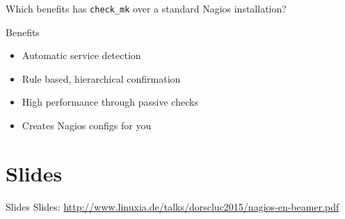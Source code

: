 Which benefits has \verb|check_mk| over a standard Nagios installation?

\begin{frame}[fragile]{Benefits}
\begin{itemize}
\item Automatic service detection
\item Rule based, hierarchical confirmation
\item High performance through passive checks
\item Creates Nagios configs for you
\end{itemize}
\end{frame}

\section{Slides}

\begin{frame}{Slides}
Slides:
\url{http://www.linuxia.de/talks/dorscluc2015/nagios-en-beamer.pdf}
\end{frame}



